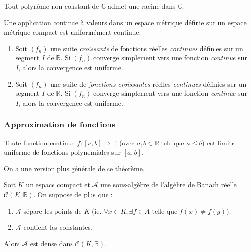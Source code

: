 
  \begin{application}
    Tout polynôme non constant de $\mathbb{C}$ admet une racine dans $\mathbb{C}$.
  \end{application}

  \begin{theorem}
    Une application continue à valeurs dans un espace métrique définie sur un espace métrique compact est uniformément continue.
  \end{theorem}


  \begin{theorem}
    \begin{enumerate}[label={\bfseries(\roman*)}]
      \item Soit $(f_n)$ une suite \textit{croissante} de fonctions réelles \textit{continues} définies sur un segment $I$ de $\mathbb{R}$. Si $(f_n)$ converge simplement vers une fonction \textit{continue} sur $I$, alors la convergence est uniforme.
      \item Soit $(f_n)$ une suite de \textit{fonctions croissantes} réelles \textit{continues} définies sur un segment $I$ de $\mathbb{R}$. Si $(f_n)$ converge simplement vers une fonction \textit{continue} sur $I$, alors la convergence est uniforme.
    \end{enumerate}
  \end{theorem}

  \subsubsection{Approximation de fonctions}


  \begin{theorem}
    Toute fonction continue $f : [a,b] \rightarrow \mathbb{R}$ (avec $a, b \in \mathbb{R}$ tels que $a \leq b$) est limite uniforme de fonctions polynomiales sur $[a, b]$.
  \end{theorem}

  On a une version plus générale de ce théorème.


  \begin{theorem}
    Soit $K$ un espace compact et $\mathcal{A}$ une sous-algèbre de l'algèbre de Banach réelle $\mathcal{C}(K, \mathbb{R})$. On suppose de plus que :
    \begin{enumerate}[label={\bfseries(\roman*)}]
      \item $\mathcal{A}$ sépare les points de $K$ (ie. $\forall x \in K, \exists f \in A \text{ telle que } f(x) \neq f(y)$).
      \item $\mathcal{A}$ contient les constantes.
    \end{enumerate}
    Alors $\mathcal{A}$ est dense dans $\mathcal{C}(K, \mathbb{R})$.
  \end{theorem}

